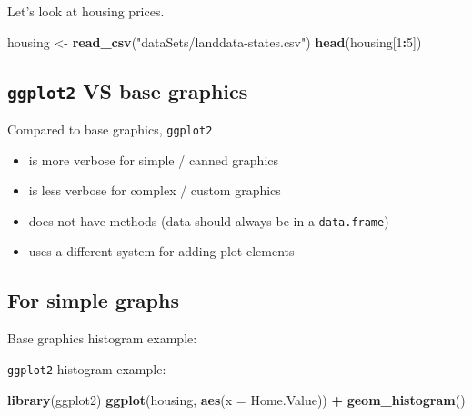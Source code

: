 \documentclass[]{book}
\newenvironment{Shaded}{\begin{snugshade}}{\end{snugshade}}
\newcommand{\KeywordTok}[1]{\textcolor[rgb]{0.13,0.29,0.53}{\textbf{#1}}}
\newcommand{\DataTypeTok}[1]{\textcolor[rgb]{0.13,0.29,0.53}{#1}}
\newcommand{\DecValTok}[1]{\textcolor[rgb]{0.00,0.00,0.81}{#1}}
\newcommand{\StringTok}[1]{\textcolor[rgb]{0.31,0.60,0.02}{#1}}
\newcommand{\OperatorTok}[1]{\textcolor[rgb]{0.81,0.36,0.00}{\textbf{#1}}}
\newcommand{\NormalTok}[1]{#1}
\providecommand{\tightlist}{%
  \setlength{\itemsep}{0pt}\setlength{\parskip}{0pt}}
\begin{document}
Let's look at housing prices.

\begin{Shaded}
\begin{Highlighting}[]
\NormalTok{housing <-}\StringTok{ }\KeywordTok{read_csv}\NormalTok{(}\StringTok{"dataSets/landdata-states.csv"}\NormalTok{)}
\KeywordTok{head}\NormalTok{(housing[}\DecValTok{1}\OperatorTok{:}\DecValTok{5}\NormalTok{])}
\end{Highlighting}
\end{Shaded}

\subsection{\texorpdfstring{\texttt{ggplot2} VS base
graphics}{ggplot2 VS base graphics}}\label{ggplot2-vs-base-graphics}

Compared to base graphics, \texttt{ggplot2}

\begin{itemize}
\tightlist
\item
  is more verbose for simple / canned graphics
\item
  is less verbose for complex / custom graphics
\item
  does not have methods (data should always be in a \texttt{data.frame})
\item
  uses a different system for adding plot elements
\end{itemize}

\subsection{For simple graphs}\label{for-simple-graphs}

Base graphics histogram example:

\begin{Shaded}
\end{Shaded}

\texttt{ggplot2} histogram example:

\begin{Shaded}
\begin{Highlighting}[]
\KeywordTok{library}\NormalTok{(ggplot2)}
\KeywordTok{ggplot}\NormalTok{(housing, }\KeywordTok{aes}\NormalTok{(}\DataTypeTok{x =}\NormalTok{ Home.Value)) }\OperatorTok{+}
\StringTok{  }\KeywordTok{geom_histogram}\NormalTok{()}
\end{Highlighting}
\end{Shaded}
\end{document}
